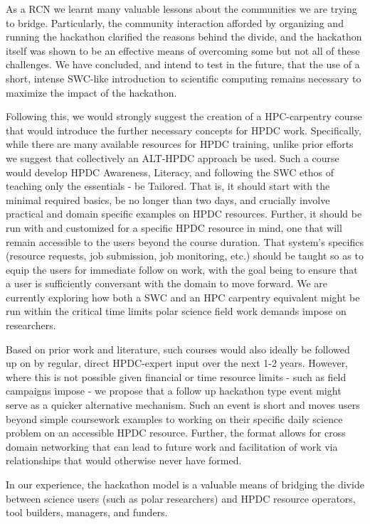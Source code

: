 \documentclass[conference]{IEEEtran}
\begin{document}
As a RCN we learnt many valuable lessons about the communities we are trying to bridge. Particularly, the community interaction afforded by organizing and running the hackathon clarified the reasons behind the divide, and the hackathon itself was shown to be an effective means of overcoming some but not all of these challenges.  We have concluded, and intend to test in the future, that the use of a short, intense SWC-like introduction to scientific computing remains necessary to maximize the impact of the hackathon.  

Following this, we would strongly suggest the creation of a HPC-carpentry course that would introduce the further necessary concepts for HPDC work. Specifically, while there are many available resources for HPDC training, unlike prior efforts we suggest that collectively an ALT-HPDC approach be used.  Such a course would develop HPDC Awareness, Literacy, and following the SWC ethos of teaching only the essentials - be Tailored. That is, it should start with the minimal required basics, be no longer than two days, and crucially involve practical and domain specific examples on HPDC resources. Further, it should be run with and customized for a specific HPDC resource in mind, one that will remain accessible to the users beyond the course duration. That system's specifics (resource requests, job submission, job monitoring, etc.) should be taught so as to equip the users for immediate follow on work, with the goal being to ensure that a user is sufficiently conversant with the domain to move forward. We are currently exploring how both a SWC and an HPC carpentry equivalent might be run within the critical time limits polar science field work demands impose on researchers.  

Based on prior work and literature, such courses would also ideally be followed up on by regular, direct HPDC-expert input over the next 1-2 years. However, where this is not possible given financial or time resource limits - such as field campaigns impose - we propose that a follow up hackathon type event might serve as a quicker alternative mechanism. Such an event is short and moves users beyond simple coursework examples to working on their specific daily science problem on an accessible HPDC resource. Further, the format allows for cross domain networking that can lead to future work and facilitation of work via relationships that would otherwise never have formed.

In our experience, the hackathon model is a valuable means of bridging the divide between science users (such as polar researchers) and HPDC resource operators, tool builders, managers, and funders.  
\end{document}
